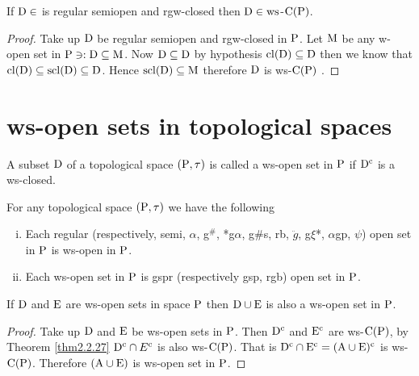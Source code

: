 \begin{thm}\label{thm2.2.47}
If $\mathrm{D}\in$ is regular semiopen and rgw-closed then $\mathrm{D}\in\mathrm{ws}$-$\mathrm{C}(\mathrm{P})$.
\end{thm}

\begin{proof}
Take up $\mathrm{D}$ be regular semiopen and rgw-closed in $\mathrm{P}$. Let $\mathrm{M}$ be any w-open set in $\mathrm{P} \ni: \mathrm{D}\subseteq \mathrm{M}$. Now $\mathrm{D}\subseteq \mathrm{D}$ by hypothesis $\mathrm{cl}(\mathrm{D})\subseteq \mathrm{D}$ then we know that $\mathrm{cl}(\mathrm{D}) \subseteq \mathrm{scl}(\mathrm{D})\subseteq \mathrm{D}$. Hence $\mathrm{scl}(\mathrm{D})\subseteq \mathrm{M}$ therefore $\mathrm{D}$ is ws-$\mathrm{C}(\mathrm{P})$ .
\end{proof}

\section{ws-open sets in topological spaces}

\begin{dfn}\label{defi2.3.1}
A subset $\mathrm{D}$ of a topological space $(\mathrm{P},\tau)$ is called a ws-open set in $\mathrm{P}$ if $\mathrm{D}^{\text{c}}$ is a ws-closed.
\end{dfn}

\begin{thm}\label{thm2.3.2}
For any topological space $(\mathrm{P},\tau)$ we have the following
\begin{enumerate}[(i)]
\item Each regular (respectively, semi, $\alpha$, g$^{\#}$, *g$\alpha$, g\#s, rb, $\ddot{g}$, g$\xi$*, $\alpha$gp, $\psi$) open set in $\mathrm{P}$ is ws-open in $\mathrm{P}$.
\item Each ws-open set in $\mathrm{P}$ is gspr (respectively gsp, rgb) open set in $\mathrm{P}$.
\end{enumerate}
\end{thm}

\begin{thm}\label{thm2.3.3}
If $\mathrm{D}$ and $\mathrm{E}$  are ws-open sets in space $\mathrm{P}$ then $\mathrm{D}\cup \mathrm{E}$  is also a ws-open set in $\mathrm{P}$.
\end{thm}

\begin{proof}
Take up $\mathrm{D}$ and $\mathrm{E}$ be ws-open sets in $\mathrm{P}$. Then $\mathrm{D}^{\text{c}}$ and $\mathrm{E}^{\text{c}}$ are ws-$\mathrm{C}(\mathrm{P})$, by Theorem \ref{thm2.2.27} $\mathrm{D}^{\text{c}} \cap E^{\text{c}}$ is also ws-$\mathrm{C}(\mathrm{P})$. That is $\mathrm{D}^{\text{c}} \cap \mathrm{E}^{\text{c}} = (\mathrm{A}\cup \mathrm{E})^{\text{c}}$ is ws-$\mathrm{C}(\mathrm{P})$. Therefore $(\mathrm{A}\cup \mathrm{E})$ is ws-open set in $\mathrm{P}$.
\end{proof}


